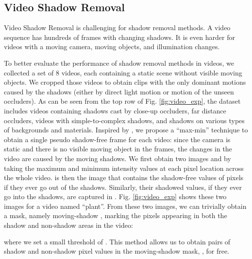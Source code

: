 \documentclass[runningheads]{llncs}
\begin{document}
\subsection{Video Shadow Removal}
\label{sec:dataset}

Video Shadow Removal is challenging for shadow removal methods. A video sequence has hundreds of frames with changing shadows. It is even harder for videos with a moving camera, moving objects, and illumination changes.

To better evaluate the performance of shadow removal methods in videos, we collected a set of 8 videos, each containing a static scene without visible moving objects. We cropped those videos to obtain clips with the only dominant motions caused by the shadows (either by  direct light motion or motion of the unseen occluders). As can be seen from the top row of Fig. \ref{fig:video_exp}, the dataset includes videos containing shadows cast by close-up occluders, far distance occluders, videos with simple-to-complex shadows, and shadows on various types of backgrounds and materials. Inspired by \cite{Chuang2003}, we propose a ``max-min'' technique to obtain a single pseudo shadow-free frame for each video: since the camera is static and there is no visible moving object in the frames, the changes in the video are caused by the moving shadows. We first obtain two images  and  by taking the maximum and minimum intensity values at each pixel location across the whole video.  is then the image that contains the shadow-free values of pixels if they ever go out of the shadows. Similarly, their shadowed values, if they ever go into the shadows, are captured in . Fig. \ref{fig:video_exp} shows these two images for a video named ``plant''. From these two images, we can trivially obtain a mask, namely moving-shadow , marking the pixels appearing in both the shadow and non-shadow areas in the video: 

where we set a small threshold of .  This method allows us to obtain pairs of shadow and non-shadow pixel values in the moving-shadow mask, , for free.
\end{document}
